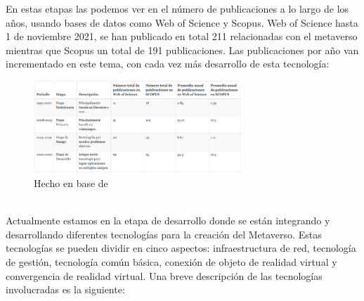 \documentclass[a4paper,10pt]{article}
\begin{document}
	En estas etapas las podemos ver en el número de publicaciones a lo largo de los años, usando bases de datos como Web of Science y Scopus. Web of Science hasta 1 de noviembre 2021, se han publicado  en total 211 relacionadas con el metaverso mientras que Scopus un total de 191 publicaciones. Las publicaciones por año van incrementado en este tema, con cada vez más desarrollo de esta tecnología:
	\begin{figure}[h]
		\centering
		\includegraphics[width=0.7\textwidth]{tablaPublicaciones.PNG}
		\caption{Hecho en base de \textcite{ning2023survey}}
		\label{fig:tabla_publicaciones}
	\end{figure} \\
	Actualmente estamos en la etapa de desarrollo donde se están integrando y desarrollando diferentes tecnologías para la creación del Metaverso.  Estas tecnologías se pueden dividir en cinco aspectos: infraestructura de red, tecnología de gestión, tecnología común básica, conexión de objeto de realidad virtual y convergencia de realidad virtual. Una breve descripción de las tecnologías involucradas es la siguiente:
\end{document}
